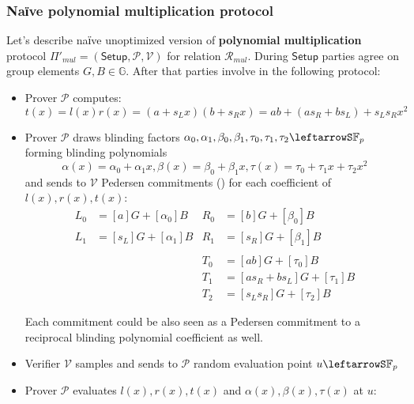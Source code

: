 \documentclass[../lecture-notes-148x210.tex]{subfiles}
\begin{document}
\subsubsection{Naїve polynomial multiplication protocol}
Let's describe naїve unoptimized version of \textbf{polynomial multiplication} protocol $\Pi'_{mul} = (\mathsf{Setup},\mathcal{P,V})$ for relation $\mathcal{R}_{mul}$. 
During $\mathsf{Setup}$ parties agree on group elements $G,B \in \mathbb{G}$. After that parties involve in the following protocol:
\begin{itemize}
    \item Prover $\mathcal{P}$ computes:
        $$t(x) = l(x)r(x) = (a+s_L x)(b+s_R x) = ab + (as_R + bs_L) + s_L s_R x^2$$
    \item Prover $\mathcal{P}$ draws blinding factors $\alpha_0, \alpha_1, \beta_0, \beta_1, \tau_0, \tau_1, \tau_2 \leftarrowS \mathbb{F}_p$ forming blinding polynomials 
    $$\alpha(x) = \alpha_0 + \alpha_1 x, \beta(x) = \beta_0 + \beta_1 x, \tau(x) = \tau_0 + \tau_1 x + \tau_2 x^2$$
    and sends to $\mathcal{V}$ Pedersen commitments () for each coefficient of $l(x), r(x), t(x)$:
        \begin{equation}
            \begin{aligned}
                L_0 &= [a]G + [\alpha_0]B & R_0 &= [b]G + [\beta_0]B\\
                L_1 &= [s_L]G + [\alpha_1]B &  R_1 &= [s_R]G + [\beta_1]B\\
                &&&\\ %
                && T_0 &= [ab]G + [\tau_0]B \\
                && T_1 &= [as_R + bs_L]G + [\tau_1]B \\
                && T_2 &= [s_L s_R]G + [\tau_2]B
            \end{aligned}
        \end{equation}
        \begin{remark}
            Each commitment could be also seen as a Pedersen commitment to a reciprocal blinding polynomial coefficient as well.
        \end{remark}
    \item Verifier $\mathcal{V}$ samples and sends to $\mathcal{P}$ random evaluation point $u \leftarrowS \mathbb{F}_p$
    \item Prover $\mathcal{P}$ evaluates $l(x),r(x),t(x)$ and $\alpha(x), \beta(x), \tau(x)$ at $u$:
        \begin{equation}

\end{equation}
\end{itemize}
\end{document}
